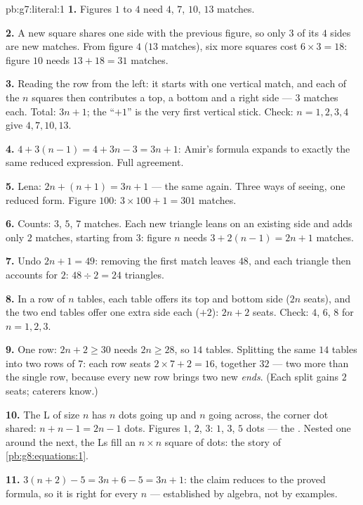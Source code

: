 \begin{solution}{pb:g7:literal:1}
\textbf{1.} Figures $1$ to $4$ need $4$, $7$, $10$, $13$
matches.

\textbf{2.} A new square shares one side with the previous
figure, so only $3$ of its $4$ sides are new matches. From
figure $4$ ($13$ matches), six more squares cost
$6 \times 3 = 18$: figure $10$ needs $13 + 18 = 31$ matches.

\textbf{3.} Reading the row from the left: it starts with one
vertical match, and each of the $n$ squares then contributes a
top, a bottom and a right side --- $3$ matches each. Total:
$3n + 1$; the ``$+1$'' is the very first vertical stick. Check:
$n = 1, 2, 3, 4$ give $4, 7, 10, 13$.

\textbf{4.} $4 + 3(n - 1) = 4 + 3n - 3 = 3n + 1$: Amir's
formula expands to exactly the same reduced expression. Full
agreement.

\textbf{5.} Lena: $2n + (n + 1) = 3n + 1$ --- the same again.
Three ways of seeing, one reduced form. Figure $100$:
$3 \times 100 + 1 = 301$ matches.

\textbf{6.} Counts: $3$, $5$, $7$ matches. Each new triangle
leans on an existing side and adds only $2$ matches, starting
from $3$: figure $n$ needs $3 + 2(n - 1) = 2n + 1$ matches.

\textbf{7.} Undo $2n + 1 = 49$: removing the first match leaves
$48$, and each triangle then accounts for $2$:
$48 \div 2 = 24$ triangles.

\textbf{8.} In a row of $n$ tables, each table offers its top
and bottom side ($2n$ seats), and the two end tables offer one
extra side each ($+2$): $2n + 2$ seats. Check: $4$, $6$, $8$
for $n = 1, 2, 3$.

\textbf{9.} One row: $2n + 2 \geq 30$ needs $2n \geq 28$, so
$14$ tables. Splitting the same $14$ tables into two rows of
$7$: each row seats $2 \times 7 + 2 = 16$, together $32$ ---
two more than the single row, because every new row brings two
new \emph{ends}. (Each split gains $2$ seats; caterers know.)

\textbf{10.} The L of size $n$ has $n$ dots going up and $n$
going across, the corner dot shared: $n + n - 1 = 2n - 1$ dots.
Figures $1$, $2$, $3$: $1$, $3$, $5$ dots --- the \emph{}. Nested one around the next, the Ls fill an
$n \times n$ square of dots: the story of
\cref{pb:g8:equations:1}.

\textbf{11.} $3(n + 2) - 5 = 3n + 6 - 5 = 3n + 1$: the claim
reduces to the proved formula, so it is right for every $n$ ---
established by algebra, not by examples.


\end{solution}
